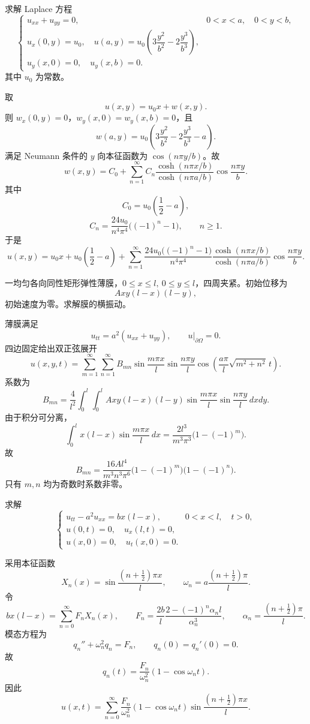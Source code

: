 \begin{question}
求解 Laplace 方程
\[
\begin{cases}
u_{xx}+u_{yy}=0,&0<x<a,
\quad 0<y<b,\\
u_x(0,y)=u_0,
\quad u(a,y)=u_0\left(3\dfrac{y^2}{b^2}-2\dfrac{y^3}{b^3}\right),\\
u_y(x,0)=0,
\quad u_y(x,b)=0.
\end{cases}
\]
其中 \(u_0\) 为常数。
\begin{solution}
取
\[
u(x,y)=u_0x+w(x,y).
\]
则 \(w_x(0,y)=0\)，\(w_y(x,0)=w_y(x,b)=0\)，且
\[
w(a,y)=u_0\left(3\frac{y^2}{b^2}-2\frac{y^3}{b^3}-a\right).
\]
满足 Neumann 条件的 \(y\) 向本征函数为 \(\cos(n\pi y/b)\)。故
\[
w(x,y)=C_0+\sum_{n=1}^{\infty}C_n
\frac{\cosh(n\pi x/b)}{\cosh(n\pi a/b)}\cos\frac{n\pi y}{b}.
\]
其中
\[
C_0=u_0\left(\frac12-a\right),
\]
\[
C_n=\frac{24u_0}{n^4\pi^4}\bigl((-1)^n-1\bigr),\qquad n\ge1.
\]
于是
\[
u(x,y)=u_0x+u_0\left(\frac12-a\right)
+\sum_{n=1}^{\infty}
\frac{24u_0\bigl((-1)^n-1\bigr)}{n^4\pi^4}
\frac{\cosh(n\pi x/b)}{\cosh(n\pi a/b)}
\cos\frac{n\pi y}{b}.
\]
\end{solution}
\end{question}

\begin{question}
一均匀各向同性矩形弹性薄膜，\(0\le x\le l,\ 0\le y\le l\)，四周夹紧。初始位移为
\[
Axy(l-x)(l-y),
\]
初始速度为零。求解膜的横振动。
\begin{solution}
薄膜满足
\[
u_{tt}=a^2(u_{xx}+u_{yy}),\qquad u|_{\partial\Omega}=0.
\]
四边固定给出双正弦展开
\[
u(x,y,t)=\sum_{m=1}^{\infty}\sum_{n=1}^{\infty}B_{mn}
\sin\frac{m\pi x}{l}\sin\frac{n\pi y}{l}
\cos\left(\frac{a\pi}{l}\sqrt{m^2+n^2}\,t\right).
\]
系数为
\[
B_{mn}=\frac{4}{l^2}\int_0^l\int_0^l
Axy(l-x)(l-y)
\sin\frac{m\pi x}{l}\sin\frac{n\pi y}{l}\,dxdy.
\]
由于积分可分离，
\[
\int_0^l x(l-x)\sin\frac{m\pi x}{l}\,dx
=\frac{2l^3}{m^3\pi^3}\bigl(1-(-1)^m\bigr).
\]
故
\[
B_{mn}=\frac{16Al^4}{m^3n^3\pi^6}
\bigl(1-(-1)^m\bigr)\bigl(1-(-1)^n\bigr).
\]
只有 \(m,n\) 均为奇数时系数非零。
\end{solution}
\end{question}

\begin{question}
求解
\[
\begin{cases}
u_{tt}-a^2u_{xx}=b x(l-x),&0<x<l,
\quad t>0,\\
u(0,t)=0,
\quad u_x(l,t)=0,\\
u(x,0)=0,
\quad u_t(x,0)=0.
\end{cases}
\]
\begin{solution}
采用本征函数
\[
X_n(x)=\sin\frac{(n+\frac12)\pi x}{l},
\qquad
\omega_n=a\frac{(n+\frac12)\pi}{l}.
\]
令
\[
bx(l-x)=\sum_{n=0}^{\infty}F_nX_n(x),
\qquad
F_n=\frac{2b}{l}\frac{2-(-1)^n\alpha_nl}{\alpha_n^3},
\qquad
\alpha_n=\frac{(n+\frac12)\pi}{l}.
\]
模态方程为
\[
q_n''+\omega_n^2q_n=F_n,
\qquad q_n(0)=q_n'(0)=0.
\]
故
\[
q_n(t)=\frac{F_n}{\omega_n^2}(1-\cos\omega_nt).
\]
因此
\[
u(x,t)=\sum_{n=0}^{\infty}\frac{F_n}{\omega_n^2}
(1-\cos\omega_nt)
\sin\frac{(n+\frac12)\pi x}{l}.
\]
\end{solution}
\end{question}

